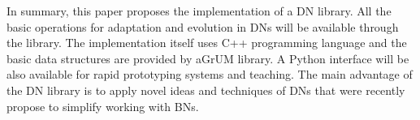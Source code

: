 \documentclass[runningheads,a4paper]{llncs}
\begin{document}
In summary, this paper proposes the implementation of a DN library.
All the basic operations for adaptation and evolution in DNs will be available through the library.
The implementation itself uses C++ programming language and the basic data structures are provided by aGrUM library.
A Python interface will be also available for rapid prototyping systems and teaching.
The main advantage of the DN library is to apply novel ideas and techniques of DNs that were recently propose to simplify working with BNs.

\newpage


\end{document}

